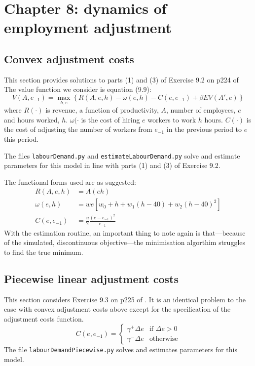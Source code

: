 \section{Chapter 8: dynamics of employment adjustment}

\subsection{Convex adjustment costs} \label{sub:demandconvex}

This section provides solutions to parts (1) and (3) of Exercise 9.2 on p224 \citet{adda2003dynamic} of The value function we consider is equation (9.9):
%
\begin{equation}
	V(A, e_{-1}) = \max_{h,e} \left\{ R(A,e,h) - \omega(e,h) - C(e,e_{-1}) + \beta EV(A', e) \right\}
\end{equation}
%
where \(R(\cdot)\) is revenue, a function of productivity, \(A\), number of employees, \(e\) and hours worked, \(h\). \(\omega(\cdot\) is the cost of hiring \(e\) workers to work \(h\) hours. \(C(\cdot)\) is the cost of adjusting the number of workers from \(e_{-1}\) in the previous period to \(e\) this period.

The files \texttt{labourDemand.py} and \texttt{estimateLabourDemand.py} solve and estimate parameters for this model in line with parts (1) and (3) of Exercise 9.2.

The functional forms used are as suggested:
%
\begin{align}
 R(A,e,h) &=  A(eh) \\
 \omega(e,h) &= we\left[w_0 + h + w_1(h - 40) + w_2(h - 40)^2\right] \\
 C(e,e_{-1}) &= \frac{\eta}{2}\frac{(e - e_{-1})^2}{e_{-1}}
\end{align}
%
With the estimation routine, an important thing to note again is that---because of the simulated, discontinuous objective---the minimisation algorthim struggles to find the true minimum.

\subsection{Piecewise linear adjustment costs} \label{sub:demandpiecewise}

This section considers Exercise 9.3 on p225 of \citet{adda2003dynamic}. It is an identical problem to the case with convex adjustment costs above except for the specification of the adjustment costs function.
%
\begin{equation}
  C(e,e_{-1})=\begin{cases}
    \gamma^{+}\Delta e & \text{if $\Delta e > 0$}\\
    \gamma^{-}\Delta e & \text{otherwise}
  \end{cases}
\end{equation}
%
The file \texttt{labourDemandPiecewise.py} solves and estimates parameters for this model.

